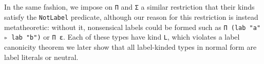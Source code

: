 \documentclass[authoryear, acmsmall, screen, review, nonacm]{acmart}
\begin{document}
\begin{code}%
\>[0]\AgdaSpace{}%
\AgdaSymbol{:}%
\>[613I]\AgdaSymbol{\{}\AgdaSpace{}%
\AgdaSpace{}%
\AgdaSymbol{:}\AgdaSpace{}%
\AgdaSpace{}%
\AgdaSpace{}%
\AgdaSpace{}%
\AgdaOperator{\AgdaInductiveConstructor{R[}}\AgdaSpace{}%
\AgdaSpace{}%
\AgdaOperator{\AgdaInductiveConstructor{]}}\AgdaSymbol{\}}\<%
\\
\>[.][@{}l@{}]\<[613I]%
\>[17]\AgdaSymbol{\{}\AgdaSpace{}%
\AgdaSymbol{:}\AgdaSpace{}%
\AgdaSpace{}%
\AgdaSymbol{(}\AgdaSpace{}%
\AgdaSymbol{)\}}\AgdaSpace{}%
\AgdaSymbol{\{}\AgdaSpace{}%
\AgdaSymbol{:}\AgdaSpace{}%
\AgdaSpace{}%
\AgdaSymbol{(}\AgdaSpace{}%
\AgdaSymbol{)\}}\AgdaSpace{}%
\<%
\\
%
\>[17]\AgdaSpace{}%
\AgdaSpace{}%
\AgdaSpace{}%
\AgdaSpace{}%
\AgdaSpace{}%
\AgdaSpace{}%
\AgdaSpace{}%
\AgdaSpace{}%
\AgdaSpace{}%
\AgdaSpace{}%
\AgdaSpace{}%
\AgdaSpace{}%
\<%
\\
\>[0]\AgdaSpace{}%
\AgdaSymbol{\{}\AgdaSpace{}%
\AgdaSymbol{=}\AgdaSpace{}%
\AgdaSymbol{\}}\AgdaSpace{}%
\AgdaSymbol{\{\AgdaUnderscore{}\}}\AgdaSpace{}%
\AgdaSymbol{\{}\AgdaSymbol{\}}\AgdaSpace{}%
\AgdaSymbol{\{}\AgdaSymbol{\}}\AgdaSpace{}%
\<%
\\
\>[0][@{}l@{\AgdaIndent{0}}]%
\>[2]\AgdaSpace{}%
\AgdaSpace{}%
\AgdaSymbol{(}\AgdaSpace{}%
\AgdaSymbol{)}\AgdaSpace{}%
\AgdaSymbol{(}\AgdaSpace{}%
\AgdaSymbol{)}\AgdaSpace{}%
\AgdaSpace{}%
\AgdaSpace{}%
\AgdaSymbol{=}\AgdaSpace{}%
\<%
\end{code} 

In the same fashion, we impose on \verb!Π! and \verb!Σ! a similar restriction that their kinds satisfy the \verb!NotLabel! predicate, although our reason for this restriction is instead metatheoretic: without it, nonsensical labels could be formed such as \verb!Π (lab "a" ▹ lab "b")! or \verb!Π ε!. Each of these types have kind \verb!L!, which violates a label canonicity theorem we later show that all label-kinded types in normal form are label literals or neutral.
\end{document}
